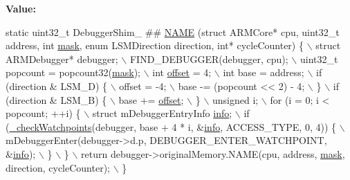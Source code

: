 {\bfseries Value\+:}
\begin{DoxyCode}
\textcolor{keyword}{static} uint32\_t DebuggerShim\_ ## \mbox{\hyperlink{inflate_8h_a164ea0159d5f0b5f12a646f25f99eceaa67bc2ced260a8e43805d2480a785d312}{NAME}} (\textcolor{keyword}{struct} ARMCore* cpu, uint32\_t address, \textcolor{keywordtype}{int} 
      \mbox{\hyperlink{isa-arm_8c_a9fa3ab2bb634e0dde316d74d14fa564f}{mask}}, \textcolor{keyword}{enum} LSMDirection direction, \textcolor{keywordtype}{int}* cycleCounter) \{ \(\backslash\)
        struct ARMDebugger* debugger; \(\backslash\)
        FIND\_DEBUGGER(debugger, cpu); \(\backslash\)
        uint32\_t popcount = popcount32(\mbox{\hyperlink{isa-arm_8c_a9fa3ab2bb634e0dde316d74d14fa564f}{mask}}); \(\backslash\)
        int \mbox{\hyperlink{ioapi_8h_a601c4660e8a1a14a1b87fe387e934d19}{offset}} = 4; \(\backslash\)
        int base = address; \(\backslash\)
        if (direction & LSM\_D) \{ \(\backslash\)
            offset = -4; \(\backslash\)
            base -= (popcount << 2) - 4; \(\backslash\)
        \} \(\backslash\)
        if (direction & LSM\_B) \{ \(\backslash\)
            base += \mbox{\hyperlink{ioapi_8h_a601c4660e8a1a14a1b87fe387e934d19}{offset}}; \(\backslash\)
        \} \(\backslash\)
        unsigned i; \(\backslash\)
        for (i = 0; i < popcount; ++i) \{ \(\backslash\)
            struct mDebuggerEntryInfo \mbox{\hyperlink{libretro_8h_a283ad41e4809f9c0ebe736a9861d8a91}{info}}; \(\backslash\)
            if (\mbox{\hyperlink{arm_2debugger_2memory-debugger_8c_af27e1b9541b0d441825fffdc4d3ad7fb}{\_checkWatchpoints}}(debugger, base + 4 * i, &\mbox{\hyperlink{libretro_8h_structretro__game__info}{info}}, ACCESS\_TYPE, 0, 4)) \{
       \(\backslash\)
                mDebuggerEnter(debugger->d.p, DEBUGGER\_ENTER\_WATCHPOINT, &\mbox{\hyperlink{libretro_8h_structretro__game__info}{info}}); \(\backslash\)
            \} \(\backslash\)
        \} \(\backslash\)
        return debugger->originalMemory.NAME(cpu, address, \mbox{\hyperlink{isa-arm_8c_a9fa3ab2bb634e0dde316d74d14fa564f}{mask}}, direction, cycleCounter); \(\backslash\)
    \}
\end{DoxyCode}
\mbox{\label{arm_2debugger_2memory-debugger_8c_a4d5ad277707fe5cfe2cbe6292720d924}} 
